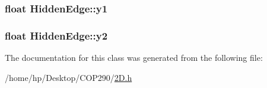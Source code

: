 \subsubsection[{\texorpdfstring{y1}{y1}}]{\setlength{\rightskip}{0pt plus 5cm}float Hidden\+Edge\+::y1}\hypertarget{class_hidden_edge_a7e1436e8b31eca0d8b944d81ff9238a1}{}\label{class_hidden_edge_a7e1436e8b31eca0d8b944d81ff9238a1}
\subsubsection[{\texorpdfstring{y2}{y2}}]{\setlength{\rightskip}{0pt plus 5cm}float Hidden\+Edge\+::y2}\hypertarget{class_hidden_edge_a63af4b7204c511284e364a8fede55d46}{}\label{class_hidden_edge_a63af4b7204c511284e364a8fede55d46}


The documentation for this class was generated from the following file\+:\begin{DoxyCompactItemize}
\item 
/home/hp/\+Desktop/\+C\+O\+P290/\hyperlink{2_d_8h}{2\+D.\+h}\end{DoxyCompactItemize}
